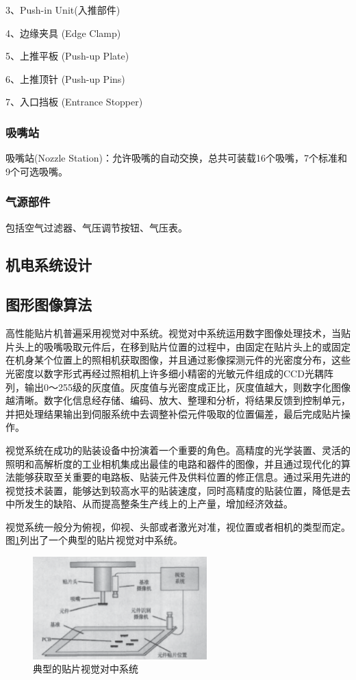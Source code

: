 \documentclass[a4paper]{article}%
\begin{document}
\begin{CJK}{UTF8}{gbsn}
3、Push-in Unit(入推部件)

4、边缘夹具 (Edge Clamp)

5、上推平板 (Push-up Plate)

6、上推顶针 (Push-up Pins)

7、入口挡板 (Entrance Stopper)
\subsubsection{吸嘴站}
吸嘴站(Nozzle Station)：允许吸嘴的自动交换，总共可装载16个吸嘴，7个标准和9个可选吸嘴。
\subsubsection{气源部件}
包括空气过滤器、气压调节按钮、气压表。
\subsection{机电系统设计}
\subsection{图形图像算法}
高性能贴片机普遍采用视觉对中系统。视觉对中系统运用数字图像处理技术，当贴片头上的吸嘴吸取元件后，在移到贴片位置的过程中，由固定在贴片头上的或固定在机身某个位置上的照相机获取图像，并且通过影像探测元件的光密度分布，这些光密度以数字形式再经过照相机上许多细小精密的光敏元件组成的CCD光耦阵列，输出0～255级的灰度值。灰度值与光密度成正比，灰度值越大，则数字化图像越清晰。数字化信息经存储、编码、放大、整理和分析，将结果反馈到控制单元，并把处理结果输出到伺服系统中去调整补偿元件吸取的位置偏差，最后完成贴片操作。

视觉系统在成功的贴装设备中扮演着一个重要的角色。高精度的光学装置、灵活的照明和高解析度的工业相机集成出最佳的电路和器件的图像，并且通过现代化的算法能够获取至关重要的电路板、贴装元件及供料位置的修正信息。通过采用先进的视觉技术装置，能够达到较高水平的贴装速度，同时高精度的贴装位置，降低是去中所发生的缺陷、从而提高整条生产线上的上产量，增加经济效益。

视觉系统一般分为俯视，仰视、头部或者激光对准，视位置或者相机的类型而定。图\ref{fig3301}列出了一个典型的贴片视觉对中系统。
\begin{figure}[htb!]
\centering
\includegraphics[width=0.6\textwidth]{fig3301.eps}
\caption{典型的贴片视觉对中系统}
\label{fig3301}
\end{figure}

\end{CJK}
\end{document}
